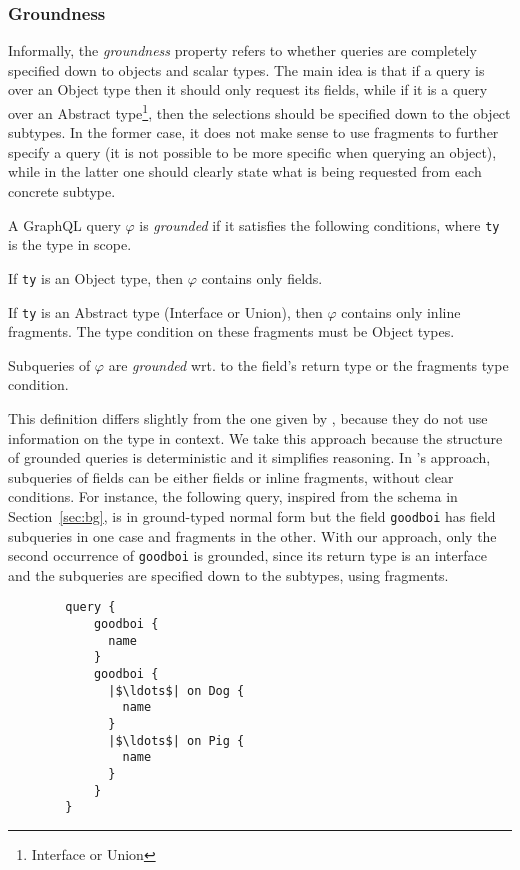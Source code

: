 \subsubsection*{Groundness}

Informally, the \textit{groundness} property refers to whether queries are completely specified down to objects and scalar types. The main idea is that if a query is over an Object type then it should only request its fields, while if it is a query over an Abstract type\footnote{Interface or Union}, then the selections should be specified down to the object subtypes. In the former case, it does not make sense to use fragments to further specify a query (it is not possible to be more specific when querying an object), while in the latter one should clearly state what is being requested from each concrete subtype.

\begin{definition}
A GraphQL query $\varphi$ is \textit{grounded} if it satisfies the following conditions, where \texttt{ty} is the type in scope.
\item If \texttt{ty} is an Object type, then $\varphi$ contains only fields.
\item If \texttt{ty} is an Abstract type (Interface or Union), then $\varphi$ contains only inline fragments. The type condition on these fragments must be Object types.
\item Subqueries of $\varphi$ are \textit{grounded} wrt. to the field's return type or the fragments type condition.
\end{definition}

This definition differs slightly from the one given by \HP{}, because they do not use information on the type in context. We take this approach because the structure of grounded queries is deterministic and it simplifies reasoning. In \HP{}'s approach, subqueries of fields can be either fields or inline fragments, without clear conditions. For instance, the following query, inspired from the schema in Section~\ref{sec:bg}, is in ground-typed normal form but the field \texttt{goodboi} has field subqueries in one case and fragments in the other. With our approach, only the second occurrence of \texttt{goodboi} is grounded, since its return type is an interface and the subqueries are specified down to the subtypes, using fragments.

\begin{verbatim}
        query {
            goodboi {
              name
            }
            goodboi {
              |$\ldots$| on Dog {
                name
              }
              |$\ldots$| on Pig {
                name
              }
            }
        }
\end{verbatim}

